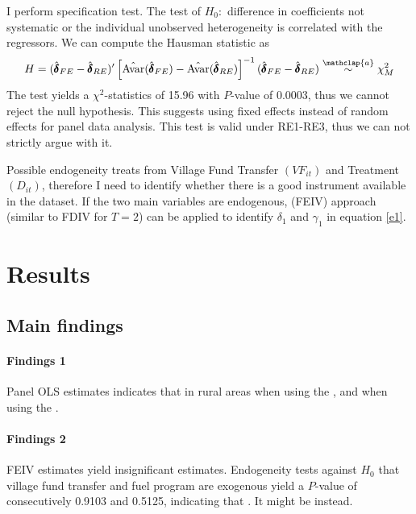 \documentclass[letterpaper,12pt,leqno]{article}
\newcommand\asym{\stackrel{\mathclap{a}}{\sim}}
\newcommand{\Av}{\text{Avar}}
\begin{document}
I perform \citet{hausman78} specification test. The test of $H_0:$ difference in coefficients not systematic or the individual unobserved heterogeneity is correlated with the regressors. We can compute the Hausman statistic as \begin{equation*}
        H=(\hat{\pmb{\delta}}_{FE}-\hat{\pmb{\delta}}_{RE})'\left[\hat{\Av}(\hat{\pmb{\delta}}_{FE})-\hat{\Av}(\hat{\pmb{\delta}}_{RE})\right]^{-1}(\hat{\pmb{\delta}}_{FE}-\hat{\pmb{\delta}}_{RE}) \asym \chi_M^2 \end{equation*}
The test yields a $\chi^2$-statistics of 15.96 with $P$-value of 0.0003, thus we cannot reject the null hypothesis. This suggests using fixed effects instead of random effects for panel data analysis. This test is valid under RE1-RE3, thus we can not strictly argue with it.

Possible endogeneity treats from Village Fund Transfer $(VF_{it})$ and Treatment $(D_{it})$, therefore I need to identify whether there is a good instrument available in the dataset. If the two main variables are endogenous,  (FEIV) approach (similar to FDIV for $T=2$) can be applied to identify $\delta_1$ and $\gamma_1$ in equation \eqref{e1}.

\section{Results}\label{s:result}
\subsection{Main findings}

\paragraph{Findings 1}
        Panel OLS estimates indicates that  in rural areas when using the , and  when using the . 
        
\paragraph{Findings 2}
        FEIV estimates yield insignificant estimates. Endogeneity tests against $H_0$ that village fund transfer and fuel program are exogenous yield a $P$-value of consecutively 0.9103 and 0.5125, indicating that . It might be  instead.
\end{document}

